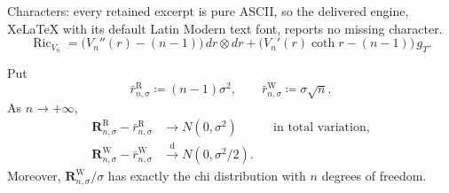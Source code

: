 \documentclass[10pt,a4paper]{amsart}
\DeclareMathOperator{\Ric}{Ric}
\begin{document}
Characters: every retained excerpt is pure ASCII, so the delivered engine, XeLaTeX with its default Latin Modern text font, reports no missing character.
	\begin{equation}\label{eq:general-weighted-ricci}
		\Ric_{V_n}
		=
		\bigl(V_n''(r)-(n-1)\bigr)\,dr\otimes dr
		+
		\bigl(V_n'(r)\coth r-(n-1)\bigr)\,g_T.
	\end{equation}

\begin{thm}
\label{thm:gaussian-radial-laws}
	Put
	\[
		\bar r^{\mathrm R}_{n,\sigma}
		\coloneqq(n-1)\sigma^2,
		\qquad
		\bar r^{\mathrm W}_{n,\sigma}
		\coloneqq\sigma\sqrt n.
	\]
	As $n\to+\infty$,
	\begin{align}
		\mathbf R^{\mathrm R}_{n,\sigma}
		-\bar r^{\mathrm R}_{n,\sigma}
		&\longrightarrow N(0,\sigma^2)
		&&\text{in total variation},
		\label{eq:R-radial-law}\\
		\mathbf R^{\mathrm W}_{n,\sigma}
		-\bar r^{\mathrm W}_{n,\sigma}
		&\overset{\mathrm d}{\longrightarrow}N(0,\sigma^2/2).
		\label{eq:W-radial-law}
	\end{align}
	Moreover, $\mathbf R^{\mathrm W}_{n,\sigma}/\sigma$ has exactly the
	chi distribution with $n$ degrees of freedom.
\end{thm}
\end{document}
